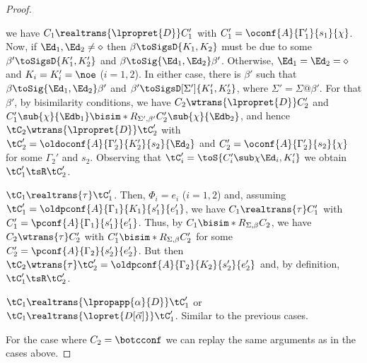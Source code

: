 \begin{proof}
\begin{asparaitem}
we have $C_1\realtrans{\lpropret{D}}C_1'$ with $C_1'=\oconf{A}{\Gamma_1'}{s_1}{\chi}$.
Now,
if $\Ed_1,\Ed_2\not=\diamond$ then 
$\beta\toSigsD{K_1,K_2}$ must be due to some $\beta'\toSigsD{K_1',K_2'}$ and $\beta\toSig{\Ed_1,\Ed_2}\beta'$. Otherwise, $\Ed_1=\Ed_2=\diamond$ and $K_i=K_i'=\noe$ ($i=1,2$). In either case, there is $\beta'$ such that $\beta\toSig{\Ed_1,\Ed_2}\beta'$ and $\beta'\toSigsD[\Sigma']{K_1',K_2'}$, where $\Sigma'=\Sigma@\beta'$.
For that $\beta'$, by bisimilarity conditions, we have $C_2\wtrans{\lpropret{D}}C_2'$ and 
$C_1'\sub{\chi}{\Edb_1} \bisim*{R}_{\Sigma',\beta'} C_2'\sub{\chi}{\Edb_2}$, and hence
$\tC_2\wtrans{\lpropret{D}}\tC_2'$ with $\tC_2'=\oldoconf{A}{\Gamma_2'}{K_2'}{s_2}{\Ed_2}$ and
$C_2'=\oconf{A}{\Gamma_2'}{s_2}{\chi}$ for some $\Gamma_2'$ and $s_2$. Observing that $\tC_i'=\toS{C_i'\sub\chi{\Ed_i},K_i'}$ we obtain $\tC_1'\tsR\tC_2'$.
\item $\tC_1\realtrans{\tau}\tC_1'$.
Then, $\Phi_i=e_i$ ($i=1,2$) and, assuming $\tC_1'=\oldpconf{A}{\Gamma_1}{K_1}{s_1'}{e_1'}$, we have $C_1\realtrans{\tau} C_1'$ with $C_1'=\pconf{A}{\Gamma_1}{s_1'}{e_1'}$. Thus, by $C_1\bisim*R_{\Sigma,\beta}C_2$, we have $C_2\wtrans{\tau}C_2'$ with $C_1'\bisim*R_{\Sigma,\beta}C_2'$ for some $C_2'=\pconf{A}{\Gamma_2}{s_2'}{e_2'}$. But then $\tC_2\wtrans{\tau}\tC_2'=\oldpconf{A}{\Gamma_2}{K_2}{s_2'}{e_2'}$ and, by definition, $\tC_1'\tsR\tC_2'$.
\item %
  $\tC_1\realtrans{\lpropapp{\alpha}{D}}\tC_1'$ or $\tC_1\realtrans{\lopret{D[\vec\alpha]}}\tC_1'$. Similar to the previous cases.
\end{asparaitem}
For the case where $C_2=\botcconf$ we can  replay the same arguments as in the cases above.

\end{proof}

